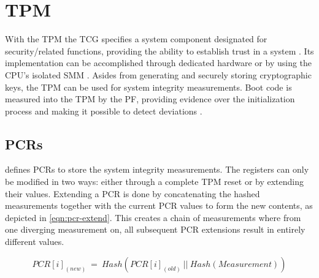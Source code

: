 
\chapter{\acf{TPM}}
\label{sec:tpm}

With the \ac{TPM} the \ac{TCG} specifies a system component designated for security\-/related functions, providing the ability to establish trust in a system \cite{microsoft-windows-trusted-platform-module-overview}.
Its implementation can be accomplished through dedicated hardware or by using the \ac{CPU}'s isolated \ac{SMM} \cite[Section 9.3]{tcg-tpm-library-part1-architecture}.
Asides from generating and securely storing cryptographic keys, the \ac{TPM} can be used for system integrity measurements.
Boot code is measured into the \ac{TPM} by the \ac{PF}, providing evidence over the initialization process and making it possible to detect deviations \cite{microsoft-windows-trusted-platform-module-overview}.

\section{\acfp{PCR}}
\label{sec:tpm:pcr}

\cite{tcg-tpm-library-part1-architecture} defines \acp{PCR} to store the system integrity measurements.
The registers can only be modified in two ways: either through a complete \ac{TPM} reset or by extending their values.
Extending a \ac{PCR} is done by concatenating the hashed measurements together with the current \ac{PCR} values to form the new contents, as depicted in \autoref{eqn:pcr-extend}.
This creates a chain of measurements where from one diverging measurement on, all subsequent \ac{PCR} extensions result in entirely different values.

\begin{equation}
    PCR[i]_{(new)}\:=\:Hash(PCR[i]_{(old)}\:||\:Hash(Measurement))
    \label{eqn:pcr-extend}
\end{equation}


